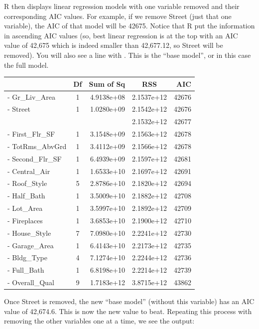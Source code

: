 \documentclass[
  letterpaper,
  DIV=11,
  numbers=noendperiod]{scrreprt}
\begin{document}
R then displays linear regression models with one variable removed and
their corresponding AIC values. For example, if we remove Street (just
that one variable), the AIC of that model will be 42675. Notice that R
put the information in ascending AIC values (so, best linear regression
is at the top with an AIC value of 42,675 which is indeed smaller than
42,677.12, so Street will be removed). You will also see a line with .
This is the ``base model'', or in this case the full model.

\begin{longtable}[]{@{}lcrcr@{}}
\toprule()
& Df & Sum of Sq & RSS & AIC \\
\midrule()
\endhead
- Gr\_Liv\_Area & 1 & 4.9138e+08 & 2.1537e+12 & 42676 \\
- Street & 1 & 1.0280e+09 & 2.1542e+12 & 42676 \\
& & & 2.1532e+12 & 42677 \\
- First\_Flr\_SF & 1 & 3.1548e+09 & 2.1563e+12 & 42678 \\
- TotRms\_AbvGrd & 1 & 3.4112e+09 & 2.1566e+12 & 42678 \\
- Second\_Flr\_SF & 1 & 6.4939e+09 & 2.1597e+12 & 42681 \\
- Central\_Air & 1 & 1.6533e+10 & 2.1697e+12 & 42691 \\
- Roof\_Style & 5 & 2.8786e+10 & 2.1820e+12 & 42694 \\
- Half\_Bath & 1 & 3.5009e+10 & 2.1882e+12 & 42708 \\
- Lot\_Area & 1 & 3.5997e+10 & 2.1892e+12 & 42709 \\
- Fireplaces & 1 & 3.6853e+10 & 2.1900e+12 & 42710 \\
- House\_Style & 7 & 7.0980e+10 & 2.2241e+12 & 42730 \\
- Garage\_Area & 1 & 6.4143e+10 & 2.2173e+12 & 42735 \\
- Bldg\_Type & 4 & 7.1274e+10 & 2.2244e+12 & 42736 \\
- Full\_Bath & 1 & 6.8198e+10 & 2.2214e+12 & 42739 \\
- Overall\_Qual & 9 & 1.7183e+12 & 3.8715e+12 & 43862 \\
\bottomrule()
\end{longtable}

Once Street is removed, the new ``base model'' (without this variable)
has an AIC value of 42,674.6. This is now the new value to beat.
Repeating this process with removing the other variables one at a time,
we see the output:
\end{document}
